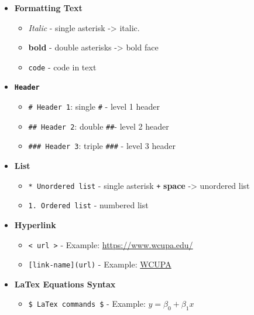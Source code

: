 \documentclass[
]{article}
\providecommand{\tightlist}{%
  \setlength{\itemsep}{0pt}\setlength{\parskip}{0pt}}
\begin{document}
\begin{itemize}
\tightlist
\item
  \textbf{Formatting Text}

  \begin{itemize}
  \tightlist
  \item
    \emph{Italic} - single asterisk -\textgreater{} italic.
  \item
    \textbf{bold} - double asterisks -\textgreater{} bold face
  \item
    \texttt{code} - code in text
  \end{itemize}
\item
  \textbf{\texttt{Header}}

  \begin{itemize}
  \tightlist
  \item
    \texttt{\#\ Header\ 1}: single \texttt{\#} - level 1 header
  \item
    \texttt{\#\#\ Header\ 2}: double \texttt{\#\#}- level 2 header
  \item
    \texttt{\#\#\#\ Header\ 3}: triple \texttt{\#\#\#} - level 3 header
  \end{itemize}
\item
  \textbf{List}

  \begin{itemize}
  \tightlist
  \item
    \texttt{*\ Unordered\ list} - single asterisk \texttt{+}
    \textbf{space} -\textgreater{} unordered list
  \item
    \texttt{1.\ Ordered\ list} - numbered list
  \end{itemize}
\item
  \textbf{Hyperlink}

  \begin{itemize}
  \tightlist
  \item
    \texttt{\textless{}\ url\ \textgreater{}} - Example:
    \url{https://www.wcupa.edu/}
  \item
    \texttt{{[}link-name{]}(url)} - Example:
    \href{https://www.wcupa.edu/}{WCUPA}
  \end{itemize}
\item
  \textbf{LaTex Equations Syntax}

  \begin{itemize}
  \tightlist
  \item
    \texttt{\$\ LaTex\ commands\ \$} - Example:
    \(y = \beta_0 + \beta_1 x\)
  \end{itemize}
\end{itemize}
\end{document}
